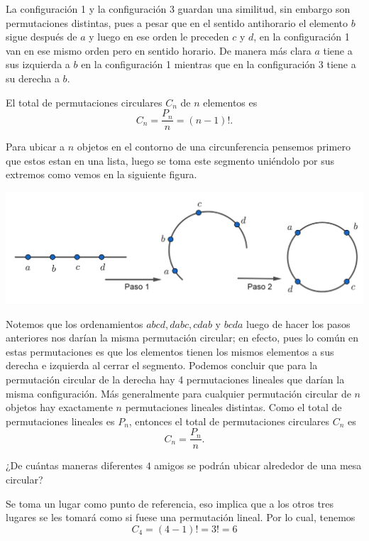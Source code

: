 La configuración 1 y la configuración 3 guardan una similitud, sin embargo son permutaciones distintas, pues a pesar que en el sentido antihorario el elemento $b$ sigue después de $a$ y luego en ese orden le preceden $c$ y $d$, en la configuración 1 van en ese mismo orden pero en sentido horario. De manera más clara $a$ tiene a sus izquierda a $b$ en la configuración 1 mientras que en la configuración 3 tiene a su derecha a $b$.\\

\begin{teorema}
    El total de permutaciones circulares $C_n$ de $n$ elementos es $$C_n=\dfrac{P_n}{n}=(n-1)!.$$
\end{teorema}

\begin{demostracion}
Para ubicar a $n$ objetos en el contorno de una circunferencia pensemos primero que estos estan en una lista, luego se toma este segmento uniéndolo por sus extremos como vemos en la siguiente figura. 
\begin{center}
    \includegraphics[scale=0.25]{Imagenes/IMG5/S1-5-02.png}
\end{center}

Notemos que los ordenamientos $abcd, dabc, cdab$ y $bcda$ luego de hacer los pasos anteriores nos darían la misma permutación circular; en efecto, pues lo común en estas permutaciones es que los elementos tienen los mismos elementos a sus derecha e izquierda al cerrar el segmento. Podemos concluir que para la permutación circular de la derecha hay 4 permutaciones lineales que darían la misma configuración. Más generalmente para cualquier permutación circular de $n$ objetos hay exactamente $n$ permutaciones lineales distintas. Como el total de permutaciones lineales es $P_n$, entonces el total de permutaciones circulares $C_n$ es $$C_n=\dfrac{P_n}{n}.$$
\end{demostracion}

\begin{ejemplo}
¿De cuántas maneras diferentes $4$ amigos se podrán ubicar alrededor de una mesa circular? 
\end{ejemplo}
\begin{solucion}
Se toma un lugar como punto de referencia, eso implica que a los otros tres lugares se les tomará como si fuese una permutación lineal. Por lo cual, tenemos
\[C_4=(4-1)!=3!=6\]
\end{solucion}

